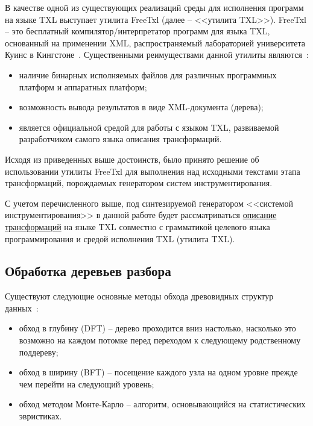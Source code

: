 В качестве одной из существующих реализаций среды для исполнения программ на языке TXL выступает утилита FreeTxl (далее -- <<утилита TXL>>).
FreeTxl -- это бесплатный компилятор/интерпретатор программ для языка TXL, основанный на применении XML, распространяемый лабораторией университета Куинс в Кингстоне~\cite{txl-freetxl}.
Существенными реимуществами данной утилиты являются~\cite{txl-freetxl}:
\begin{itemize}[noitemsep]
  \item наличие бинарных исполняемых файлов для различных программных платформ и аппаратных платформ;
  \item возможность вывода результатов в виде XML-документа (дерева);
  \item является официальной средой для работы с языком TXL, развиваемой разработчиком самого языка описания трансформаций.
\end{itemize}

Исходя из приведенных выше достоинств, было принято решение об использовании утилиты FreeTxl для выполнения над исходными текстами этапа трансформаций, порождаемых генератором систем инструментирования.

С учетом перечисленного выше, под синтезируемой генератором <<системой инструментирования>> в данной работе будет рассматриваться \underline{описание трансформаций} на языке TXL совместно с грамматикой целевого языка программирования и средой исполнения TXL (утилита TXL).

\subsection{Обработка деревьев разбора}

Существуют следующие основные методы обхода древовидных структур данных~\cite{cormen2009introduction}:
\begin{itemize}[noitemsep]
  \item обход в глубину (DFT) -- дерево проходится вниз настолько, насколько это возможно на каждом потомке перед переходом к следующему родственному поддереву;
  \item обход в ширину (BFT) -- посещение каждого узла на одном уровне прежде чем перейти на следующий уровень;
  \item обход методом Монте-Карло -- алгоритм, основывающийся на статистических эвристиках.
\end{itemize}

